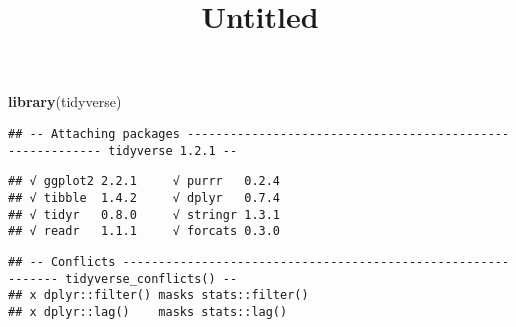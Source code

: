 \documentclass[]{article}
\title{Untitled}
\author{}
\date{}
\newenvironment{Shaded}{\begin{snugshade}}{\end{snugshade}}
\newcommand{\KeywordTok}[1]{\textcolor[rgb]{0.13,0.29,0.53}{\textbf{#1}}}
\newcommand{\StringTok}[1]{\textcolor[rgb]{0.31,0.60,0.02}{#1}}
\newcommand{\CommentTok}[1]{\textcolor[rgb]{0.56,0.35,0.01}{\textit{#1}}}
\newcommand{\OperatorTok}[1]{\textcolor[rgb]{0.81,0.36,0.00}{\textbf{#1}}}
\newcommand{\NormalTok}[1]{#1}
\begin{document}
\maketitle

\begin{Shaded}
\begin{Highlighting}[]
\KeywordTok{library}\NormalTok{(tidyverse)}
\end{Highlighting}
\end{Shaded}

\begin{verbatim}
## -- Attaching packages ---------------------------------------------------------- tidyverse 1.2.1 --
\end{verbatim}

\begin{verbatim}
## √ ggplot2 2.2.1     √ purrr   0.2.4
## √ tibble  1.4.2     √ dplyr   0.7.4
## √ tidyr   0.8.0     √ stringr 1.3.1
## √ readr   1.1.1     √ forcats 0.3.0
\end{verbatim}

\begin{verbatim}
## -- Conflicts ------------------------------------------------------------- tidyverse_conflicts() --
## x dplyr::filter() masks stats::filter()
## x dplyr::lag()    masks stats::lag()
\end{verbatim}

\begin{Shaded}
\end{Shaded}
\end{document}
